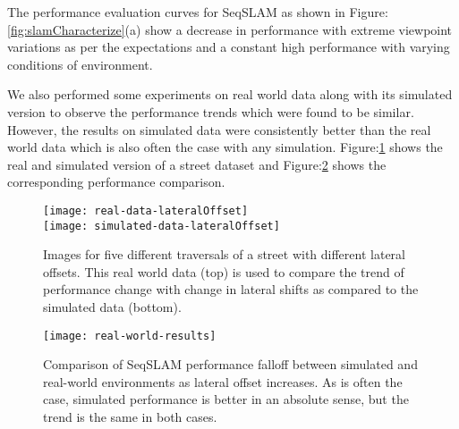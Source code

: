 \documentclass{article}
\begin{document}
The performance evaluation curves for SeqSLAM as shown in Figure:\ref{fig:slamCharacterize}(a) show a decrease in performance with extreme viewpoint variations as per the expectations and a constant high performance with varying conditions of environment. 

We also performed some experiments on real world data along with its simulated version to observe the performance trends which were found to be similar. However, the results on simulated data were consistently better than the real world data which is also often the case with any simulation. Figure:\ref{fig:realVsSim} shows the real and simulated version of a street dataset and Figure:\ref{fig:real-world-results} shows the corresponding performance comparison.

\begin{figure}
\centering
  \texttt{[image: real-data-lateralOffset]}\\
  \texttt{[image: simulated-data-lateralOffset]}\\
  
  \caption{Images for five different traversals of a street with different lateral offsets. This real world data (top) is used to compare the trend of performance change with change in lateral shifts as compared to the simulated data (bottom).}
  \label{fig:realVsSim}
\end{figure}

\begin{figure}[t]
    \centering
    \texttt{[image: real-world-results]}
    \caption{Comparison of SeqSLAM performance falloff between simulated and real-world environments as lateral offset increases. As is often the case, simulated performance is better in an absolute sense, but the trend is the same in both cases.}
    \label{fig:real-world-results}
\end{figure}
\end{document}

